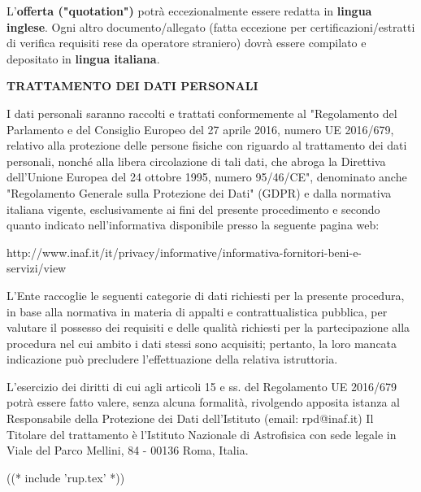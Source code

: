 L'\textbf{offerta ("quotation")} potrà eccezionalmente essere
redatta in \textbf{lingua inglese}. Ogni altro documento/allegato
(fatta eccezione per certificazioni/estratti di verifica requisiti
rese da operatore straniero) dovrà essere compilato e depositato in
\textbf{lingua italiana}.

\textbf{TRATTAMENTO DEI DATI PERSONALI}

I dati personali saranno raccolti e trattati conformemente al "Regolamento
del Parlamento e del Consiglio Europeo del 27 aprile 2016, numero UE
2016/679,  relativo alla protezione delle persone fisiche con riguardo
al trattamento dei dati personali, nonché alla libera circolazione
di tali dati, che abroga la Direttiva dell'Unione Europea del 24
ottobre 1995, numero 95/46/CE", denominato anche "Regolamento Generale
sulla Protezione dei Dati" (GDPR) e dalla normativa italiana vigente,
esclusivamente ai fini del presente procedimento e secondo quanto indicato
nell'informativa disponibile presso la seguente pagina web:

http://www.inaf.it/it/privacy/informative/informativa-fornitori-beni-e-servizi/view

L'Ente raccoglie le seguenti categorie di dati richiesti per la
presente procedura, in base alla normativa in materia di appalti
e contrattualistica pubblica, per valutare il possesso dei requisiti
e delle qualità richiesti per la partecipazione alla procedura nel cui
ambito i dati stessi sono acquisiti; pertanto, la loro mancata indicazione
può precludere l'effettuazione della relativa istruttoria.

L'esercizio dei diritti di cui agli articoli 15 e ss. del Regolamento UE
2016/679 potrà essere fatto valere, senza alcuna formalità, rivolgendo
apposita istanza al Responsabile della Protezione dei Dati dell'Istituto
(email: rpd@inaf.it) Il Titolare del trattamento è l'Istituto Nazionale
di Astrofisica con sede legale in Viale del Parco Mellini, 84 - 00136
Roma, Italia.

((* include 'rup.tex' *))

